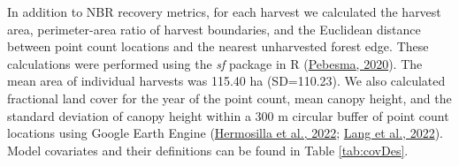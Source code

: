 \documentclass[
  12pt,
]{article}
\begin{document}
In addition to NBR recovery metrics, for each harvest we calculated the harvest area, perimeter-area ratio of harvest boundaries, and the Euclidean distance between point count locations and the nearest unharvested forest edge. These calculations were performed using the \emph{sf} package in R (\protect\hyperlink{ref-R-sf}{Pebesma, 2020}). The mean area of individual harvests was 115.40 ha (SD=110.23). We also calculated fractional land cover for the year of the point count, mean canopy height, and the standard deviation of canopy height within a 300 m circular buffer of point count locations using Google Earth Engine (\protect\hyperlink{ref-hermosillaLandCoverClassification2022}{Hermosilla et al., 2022}; \protect\hyperlink{ref-lang2022high}{Lang et al., 2022}). Model covariates and their definitions can be found in Table \ref{tab:covDes}.
\end{document}
